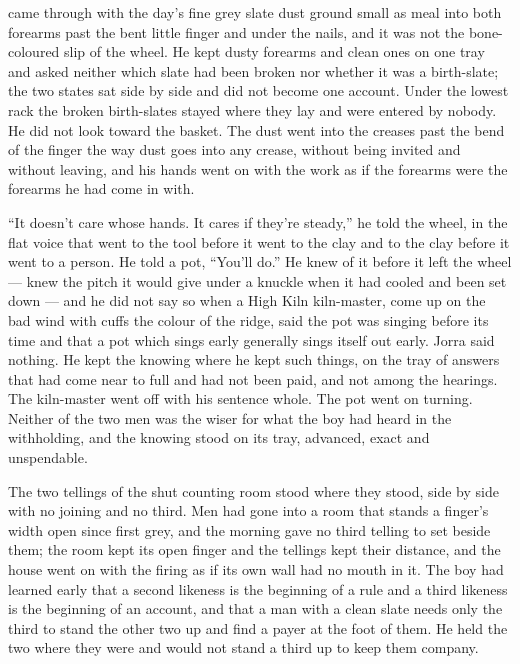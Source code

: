  came through with the day's fine grey slate dust ground small as meal into both forearms past the bent little finger and under the nails, and it was not the bone-coloured slip of the wheel. He kept dusty forearms and clean ones on one tray and asked neither which slate had been broken nor whether it was a birth-slate; the two states sat side by side and did not become one account. Under the lowest rack the broken birth-slates stayed where they lay and were entered by nobody. He did not look toward the basket. The dust went into the creases past the bend of the finger the way dust goes into any crease, without being invited and without leaving, and his hands went on with the work as if the forearms were the forearms he had come in with.

“It doesn't care whose hands. It cares if they're steady,” he told the wheel, in the flat voice that went to the tool before it went to the clay and to the clay before it went to a person. He told a pot, “You'll do.” He knew  of it before it left the wheel --- knew the pitch it would give under a knuckle when it had cooled and been set down --- and he did not say so when a High Kiln kiln-master, come up on the bad wind with cuffs the colour of the ridge, said the pot was singing before its time and that a pot which sings early generally sings itself out early. Jorra said nothing. He kept the knowing where he kept such things, on the tray of answers that had come near to full and had not been paid, and not among the hearings. The kiln-master went off with his sentence whole. The pot went on turning. Neither of the two men was the wiser for what the boy had heard in the withholding, and the knowing stood on its tray, advanced, exact and unspendable.

The two tellings of the shut counting room stood where they stood, side by side with no joining and no third. Men had gone into a room that stands a finger's width open since first grey, and the morning gave no third telling to set beside them; the room kept its open finger and the tellings kept their distance, and the house went on with the firing as if its own wall had no mouth in it. The boy had learned early that a second likeness is the beginning of a rule and a third likeness is the beginning of an account, and that a man with a clean slate needs only the third to stand the other two up and find a payer at the foot of them. He held the two where they were and would not stand a third up to keep them company.

\scenebreak

